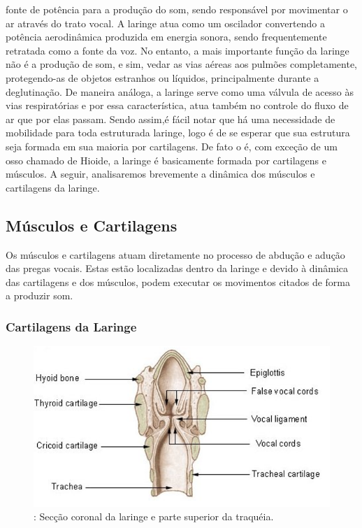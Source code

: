 	fonte de potência para a produção do som, sendo responsável por movimentar o ar através do trato vocal. A laringe atua como um oscilador convertendo a potência aerodinâmica produzida em energia sonora, sendo frequentemente retratada como a fonte da voz. No entanto, a mais importante função da laringe não é a produção de som, e sim, vedar as vias aéreas aos pulmões completamente, protegendo-as de objetos estranhos ou líquidos, principalmente durante a deglutinação. De maneira análoga, a laringe serve como uma válvula de acesso às vias respiratórias e por essa característica, atua também no controle do ﬂuxo de ar que por elas passam. Sendo assim,é fácil notar que há uma necessidade de mobilidade para toda estruturada laringe, logo é de se esperar que sua estrutura seja formada em sua maioria por cartilagens. De fato o é, com exceção de um osso chamado de Hioide, a laringe é basicamente formada por cartilagens e músculos. A seguir, analisaremos brevemente a dinâmica dos músculos e cartilagens da laringe.
	\subsection{Músculos e Cartilagens}
	Os músculos e cartilagens atuam diretamente no processo de abdução e adução das pregas vocais. Estas estão localizadas dentro da laringe e devido à dinâmica das cartilagens e dos músculos, podem executar os movimentos citados de forma a produzir som.
	
	\subsubsection{Cartilagens da Laringe}

	
	\begin{figure}
		\centering
		\includegraphics[scale=0.5]{cartilagensLaringe}
		\caption{: Secção coronal da laringe e parte superior da traquéia.~\cite{Foundation1}}
		\label{fig:aparelhoFonador}
	\end{figure}
	
